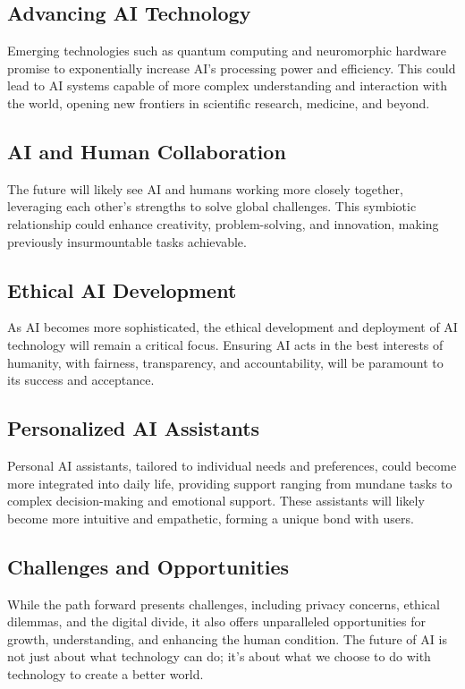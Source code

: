 \documentclass[12pt]{article}
\begin{document}
\subsection*{Advancing AI Technology}
Emerging technologies such as quantum computing and neuromorphic hardware promise to exponentially increase AI's processing power and efficiency. This could lead to AI systems capable of more complex understanding and interaction with the world, opening new frontiers in scientific research, medicine, and beyond.

\subsection*{AI and Human Collaboration}
The future will likely see AI and humans working more closely together, leveraging each other's strengths to solve global challenges. This symbiotic relationship could enhance creativity, problem-solving, and innovation, making previously insurmountable tasks achievable.

\subsection*{Ethical AI Development}
As AI becomes more sophisticated, the ethical development and deployment of AI technology will remain a critical focus. Ensuring AI acts in the best interests of humanity, with fairness, transparency, and accountability, will be paramount to its success and acceptance.

\subsection*{Personalized AI Assistants}
Personal AI assistants, tailored to individual needs and preferences, could become more integrated into daily life, providing support ranging from mundane tasks to complex decision-making and emotional support. These assistants will likely become more intuitive and empathetic, forming a unique bond with users.

\subsection*{Challenges and Opportunities}
While the path forward presents challenges, including privacy concerns, ethical dilemmas, and the digital divide, it also offers unparalleled opportunities for growth, understanding, and enhancing the human condition. The future of AI is not just about what technology can do; it's about what we choose to do with technology to create a better world.
\end{document}
